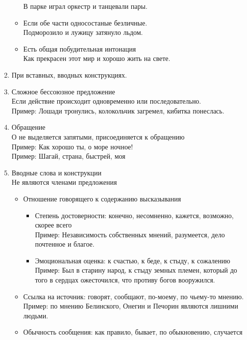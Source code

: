 \documentclass{article}
\begin{document}
\begin{enumerate}
\begin{itemize}
    В парке играл оркестр и танцевали пары.
  \item
    Если обе части односостаные безличные.\\
    Подморозило и лужицу затянуло льдом.
  \item
    Есть общая побудительная интонация\\
    Как прекрасен этот мир и хорошо жить на свете.
  \end{itemize}
\item
  При вставных, вводных конструкциях.\\
\item
  Сложное бессоюзное предложение\\
  Если действие происходит одновременно или последовательно.\\
  Пример: Лошади тронулись, колокольчик загремел, кибитка понеслась.
\item
  Обращение\\
  О не выделяется запятыми, присоединяется к обращению\\
  Пример: Как хорошо ты, о море ночное!\\
  Пример: Шагай, страна, быстрей, моя
\item
  Вводные слова и конструкции\\
  Не являются членами предложения\\
  \begin{itemize}
  \item
    Отношение говорящего к содержанию высказывания\\
    \begin{itemize}
    \item
      Степень достоверности: конечно, несомненно, кажется, возможно, скорее всего\\
      Пример: Независимость собственных мнений, разумеется, дело почтенное и благое.
    \item
      Эмоциональная оценка: к счастью, к беде, к стыду, к сожалению\\
      Пример: Был в старину народ, к стыду земных племен, который до того в сердцах ожесточился, что противу богов
      вооружился.
    \end{itemize}
  \item
    Ссылка на источник: говорят, сообщают, по-моему, по чьему-то мнению.\\
    Пример: по мнению Белинского, Онегин и Печорин являются лишними людьми.
  \item
    Обычность сообщения: как правило, бывает, по обыкновению, случается\\

\end{itemize}
\end{enumerate}
\end{document}
